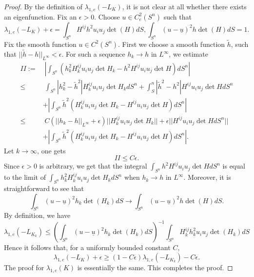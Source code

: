 \documentclass[reqno]{amsart}
\theoremstyle{remark}
\theoremstyle{plain}
\begin{document}
\begin{proof}
By the definition of $\lambda_{1, e}(-L_K)$, it is not clear at all whether there exists an eigenfunction. Fix an $\epsilon>0$. Choose $u\in C^2_e(S^n)$ such that 
\[
\lambda_{1, e}(-L_K)+\epsilon= \int_{S^n}H^{ij}h^2u_iu_j\det(H)dS, \int_{S^n}{(u-\underline u)^2} h\det(H)dS=1.
\]
Fix the smooth function $u\in C^2(S^n)$. First we choose a smooth function $\tilde{h}$, such that $||\tilde{h}-h||_{L^\infty}<\epsilon$. 
For such a sequence $h_k\rightarrow h$ in $L^\infty$, we estimate \[
\begin{aligned}
    II:=&\;|\int_{S^n}(h_k^2H_k^{ij}u_iu_j\det H_k-h^2H^{ij}u_iu_j\det H)dS^n|\\
    \leq &\;\int_{S^n}|h_k^2-\tilde{h}^2|H_k^{ij}u_iu_j\det H_kdS^n+\int_S^n|\tilde{h}^2-h^2|H^{ij}u_iu_j\det HdS^n\\
    &+|\int_{S^n}\tilde{h}^2(H_k^{ij}u_iu_j\det H_k-H^{ij}u_iu_j\det H)dS^n|\\
    \leq &\;C(||h_k-h||_{L^\infty}+\epsilon)||H_k^{ij}u_iu_j\det H_k||+\epsilon||H^{ij}u_iu_j\det HdS^n||\\
    &+|\int_{S^n}\tilde{h}^2(H_k^{ij}u_iu_j\det H_k-H^{ij}u_iu_j\det H)dS^n|.
\end{aligned}
\]Let $k\rightarrow \infty$, one gets \[
II\leq C\epsilon.
\]Since $\epsilon>0 $ is arbitrary, we get that the integral $\int_{S^n}h^2H^{ij}u_iu_j\det HdS^n$ is equal to the limit of $\int_{S^n}h_k^2H_k^{ij}u_iu_j\det H_kdS^n$ when $h_k\rightarrow h$ in $L^\infty$. Moreover, it is straightforward to see that 
\[
\int_{S^n}{(u-\underline u)^2} h_k\det(H_k)dS\rightarrow \int_{S^n}{(u-\underline u)^2} h\det(H)dS.
\]
By definition, we have
\[
\lambda_{1, e}(-L_{K_k})\leq \left(\int_{S^n}{(u-\underline u)^2} h_k\det(H_k)dS\right)^{-1}\int_{S^n}H^{ij}_kh^2_ku_iu_j\det(H_k)dS
\]
Hence it follows that, for a uniformly bounded constant $C$, 
\[
\lambda_{1, e}(-L_K)+\epsilon \geq (1-C\epsilon)\lambda_{1, e}(-L_{K_k})-C\epsilon.
\]
The proof for $\lambda_{1, e}(K)$ is essentially the same. 
This completes the proof. 
\end{proof}
\end{document}
